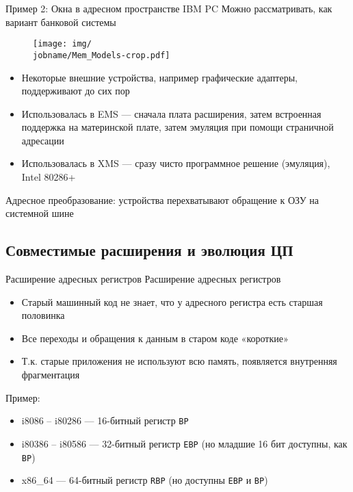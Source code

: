 \documentclass[xetex,aspectratio=43]{beamer}
\begin{document}
\begin{frame}{Пример 2: Окна в адресном пространстве IBM PC}
    Можно рассматривать, как вариант банковой системы

    \begin{figure}
        \texttt{[image: img/\\jobname/Mem\_Models-crop.pdf]}
    \end{figure}

    \begin{itemize}
        \tightlist
        \item
        Некоторые внешние устройства, например графические адаптеры,
        поддерживают до сих пор
        \item
        Использовалась в EMS --- сначала плата расширения, затем встроенная
        поддержка на материнской плате, затем эмуляция при помощи страничной
        адресации
    \end{itemize}

    \pause

    \begin{itemize}
        \tightlist
        \item
        Использовалась в XMS --- сразу чисто программное решение (эмуляция),
        Intel 80286+
    \end{itemize}

    Адресное преобразование: устройства перехватывают обращение к ОЗУ на
    системной шине
\end{frame}

\subsection{Совместимые расширения и эволюция ЦП}

\begin{frame}[fragile]{Расширение адресных регистров}
    Расширение адресных регистров

    \begin{itemize}
        \tightlist
        \item
        Старый машинный код не знает, что у адресного регистра есть старшая
        половинка
        \item
        Все переходы и обращения к данным в старом коде «короткие»
        \item
        Т.к. старые приложения не используют всю память, появляется внутренняя
        фрагментация
    \end{itemize}

    \pause

    Пример:

    \begin{itemize}
        \tightlist
        \item
        i8086 -- i80286 --- 16-битный регистр \texttt{BP}
        \item
        i80386 -- i80586 --- 32-битный регистр \texttt{EBP} (но младшие 16 бит
        доступны, как \texttt{BP})
        \item
        x86\_64 --- 64-битный регистр \texttt{RBP} (но доступны \texttt{EBP} и
        \texttt{BP})
    \end{itemize}

\end{frame}
\end{document}
